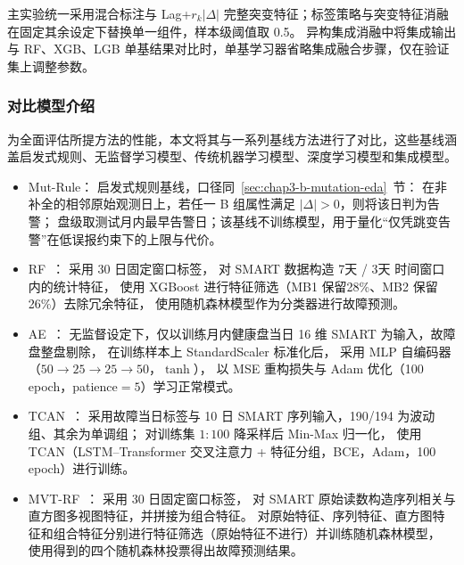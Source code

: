 主实验统一采用混合标注与 Lag+$r_k|\Delta|$ 完整突变特征；标签策略与突变特征消融在固定其余设定下替换单一组件，样本级阈值取 0.5。
异构集成消融中将集成输出与 RF、XGB、LGB 单基结果对比时，单基学习器省略集成融合步骤，仅在验证集上调整参数。

\subsubsection{对比模型介绍}

为全面评估所提方法的性能，本文将其与一系列基线方法进行了对比，这些基线涵盖启发式规则、无监督学习模型、传统机器学习模型、深度学习模型和集成模型。

\begin{itemize}[noitemsep, topsep=4pt, parsep=0pt]
    \item Mut-Rule：
        启发式规则基线，口径同~\ref{sec:chap3-b-mutation-eda}~节：
        在非补全的相邻原始观测日上，若任一 B 组属性满足 $|\Delta|>0$，则将该日判为告警；
        盘级取测试月内最早告警日；该基线不训练模型，用于量化“仅凭跳变告警”在低误报约束下的上限与代价。
    \item RF~\cite{xu2021general}：
        采用 30 日固定窗口标签，
        对 SMART 数据构造 7天 / 3天 时间窗口内的统计特征，
        使用 XGBoost 进行特征筛选（MB1 保留28\%、MB2 保留26\%）去除冗余特征，
        使用随机森林模型作为分类器进行故障预测。
    \item AE~\cite{chakraborttii2020improving}：
        无监督设定下，仅以训练月内健康盘当日 16 维 SMART 为输入，故障盘整盘剔除，
        在训练样本上 StandardScaler 标准化后，
        采用 MLP 自编码器（$50{\rightarrow}25{\rightarrow}25{\rightarrow}50$，$\tanh$），
        以 MSE 重构损失与 Adam 优化（100 epoch，patience${=}5$）学习正常模式。
    \item TCAN~\cite{koh2024temporal}：
        采用故障当日标签与 10 日 SMART 序列输入，190/194 为波动组、其余为单调组；
        对训练集 $1{:}100$ 降采样后 Min-Max 归一化，
        使用 TCAN（LSTM--Transformer 交叉注意力 + 特征分组，BCE，Adam，100 epoch）进行训练。
    \item MVT-RF~\cite{zhang2023multi}：
        采用 30 日固定窗口标签，
        对 SMART 原始读数构造序列相关与直方图多视图特征，并拼接为组合特征。
        对原始特征、序列特征、直方图特征和组合特征分别进行特征筛选（原始特征不进行）并训练随机森林模型，
        使用得到的四个随机森林投票得出故障预测结果。
        

\end{itemize}

